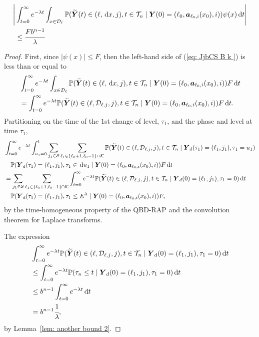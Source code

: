 \begin{cor}\label{vcor: cdks d}
	\begin{align}
		\Bigg|&\int_{t=0}^\infty e^{-\lambda t}\int_{x\in\mathcal{D}_\ell}\mathbb P(\widetilde{\boldsymbol Y}(t) \in (\ell,\, \mathrm{d} x, j), t\in\mathcal T_n \mid 
		\boldsymbol Y(0)=(\ell_0, \boldsymbol a_{\ell_0,i}(x_0), i))
		\psi(x) \, \mathrm{d} t \Bigg|\nonumber
		\\&\leq \cfrac{F b^{n-1}}{\lambda}\label{eq: JjbCS  B k }
	\end{align}
\end{cor}
\begin{proof}
	First, since \(|\psi(x)|\leq F\), then the left-hand side of (\ref{eq: JjbCS  B k }) is less than or equal to 
	\begin{align}
		&\int_{t=0}^\infty e^{-\lambda t}\int_{x\in\mathcal{D}_\ell}\mathbb P(\widetilde{\boldsymbol Y}(t) \in (\ell,\, \mathrm{d} x,j), t\in\mathcal T_n \mid  \nonumber 
		\boldsymbol Y(0)=(\ell_0, \boldsymbol a_{\ell_0,i}(x_0), i))F\, \mathrm{d} t \nonumber
		\\&=\int_{t=0}^\infty e^{-\lambda t} \mathbb P(\widetilde{\boldsymbol Y}(t) \in (\ell,\mathcal D_{\ell,j},j), t\in\mathcal T_n \mid \boldsymbol Y(0)=(\ell_0, \boldsymbol a_{\ell_0,i}(x_0), i))F\, \mathrm{d} t. \nonumber
	\end{align}
	Partitioning on the time of the \(1\)st change of level, \(\tau_1\), and the phase and level at time \(\tau_1\), 
	\begin{align}
		&\int_{t=0}^\infty e^{-\lambda t} \int_{u_1=0}^t \sum_{j_1\in\mathcal S}\sum_{\ell_1\in\{\ell_0+1,\ell_0-1\}\cap\mathcal K}\mathbb P(\widetilde{\boldsymbol Y}(t) \in (\ell,\mathcal D_{\ell,j},j), t\in\mathcal T_n \nonumber
		\mid \boldsymbol Y_d(\tau_1)=(\ell_1,j_1),  \tau_1=u_1)\nonumber
		\\&\quad\mathbb P(\boldsymbol Y_d(\tau_1)=(\ell_1,j_1), \tau_1\in \, \mathrm{d} u_1
		\mid \boldsymbol Y(0)=(\ell_0, \boldsymbol a_{\ell_0,i}(x_0), i))F  \, \mathrm{d} t\nonumber
		\\&= \sum_{j_1\in\mathcal S}\sum_{\ell_1\in\{\ell_0+1,\ell_0-1\}\cap\mathcal K} \int_{t=0}^\infty e^{-\lambda t} \mathbb P(\widetilde{\boldsymbol Y}(t) \in (\ell,\mathcal D_{\ell,j},j), t\in\mathcal T_n \nonumber
		\mid \boldsymbol Y_d(0)=(\ell_1,j_1), \tau_1=0) \, \mathrm{d} t 
		\\&\quad{}\mathbb P(\boldsymbol Y_d(\tau_1)=(\ell_1,j_1), \tau_1\leq E^\lambda
		\mid \boldsymbol Y(0)=(\ell_0, \boldsymbol a_{\ell_0,i}(x_0), i))F, \label{eqn fLks}
	\end{align}
	by the time-homogeneous property of the QBD-RAP and the convolution theorem for Laplace transforms. 
	
	The expression 
	\begin{align}
		&\int_{t=0}^\infty e^{-\lambda t} \mathbb P(\widetilde{\boldsymbol Y}(t) \in (\ell,\mathcal D_{\ell,j},j), t\in\mathcal T_n\nonumber
		\mid \boldsymbol Y_d(0)=(\ell_1,j_1), \tau_1=0) \, \mathrm{d} t
		\\&\leq \int_{t=0}^\infty e^{-\lambda t} \mathbb P(\tau_{n}\leq t \nonumber
		\mid \boldsymbol Y_d(0)=(\ell_1,j_1), \tau_1=0) \, \mathrm{d} t
		\\&\leq b^{n-1}\int_{t=0}^\infty e^{-\lambda t} \, \mathrm{d} t \nonumber 
		\\&=b^{n-1}\cfrac{1}{\lambda}, \label{eq: bndhs vja sdh}
	\end{align}
	by Lemma~\ref{lem: another bound 2}.
	

\end{proof}
